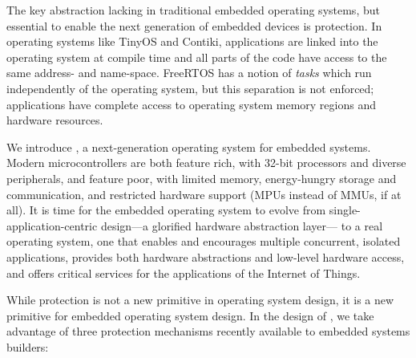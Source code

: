 The key abstraction lacking in traditional embedded operating systems, but
essential to enable the next generation of embedded devices is protection. In
operating systems like TinyOS and Contiki, applications are linked into the
operating system at compile time and all parts of the code have access to the
same address- and name-space. FreeRTOS has a notion of \emph{tasks} which run
independently of the operating system, but this separation is not enforced;
applications have complete access to operating system memory regions and
hardware resources.

We introduce \name, a next-generation operating system for embedded systems.
Modern microcontrollers are both feature rich, with 32-bit processors and
diverse peripherals, and feature poor, with limited memory, energy-hungry
storage and communication, and restricted hardware support (MPUs instead of
MMUs, if at all).
%
It is time for the embedded operating system to evolve from single-application-centric
design---a glorified hardware abstraction layer---%
to a real operating system, %
one that enables and encourages multiple concurrent, isolated applications,
provides both hardware abstractions and low-level hardware access, and offers
critical services for the applications of the Internet of Things.


%

While protection is not a new primitive in operating system design, it is a
new primitive for embedded operating system design. In the design of \name, we
take advantage of three protection mechanisms recently available to embedded
systems builders:

